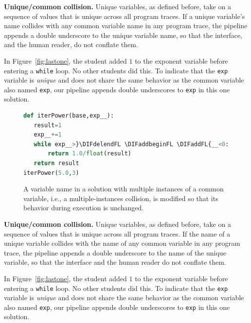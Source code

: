 \documentclass[12pt,twoside]{mitthesis}
\newcommand \codevar[1]{\texttt{#1}}
\providecommand{\DIFaddtex}[1]{{\protect\color{blue}\uwave{#1}}} %
\providecommand{\DIFaddFL}[1]{\DIFadd{#1}} %
\providecommand{\DIFaddbeginFL}{} %
\providecommand{\DIFdelendFL}{} %
\providecommand{\DIFadd}[1]{\texorpdfstring{\DIFaddtex{#1}}{#1}} %
\begin{document}
{\bf Unique/common collision.} Unique variables, as defined before, take on a sequence of values that is unique across all program traces. If a unique variable's name collides with any common variable name in any program trace, the pipeline appends a double underscore to the unique variable name, so that the interface, and the human reader, do not conflate them. 

In Figure~\ref{fig:lastone}, the student added $1$ to the exponent variable before entering a \codevar{while} loop. No other students did this. To indicate that the \codevar{exp} variable is {\it unique} and does not share the same behavior as the common variable also named \codevar{exp}, our pipeline appends double underscores to \codevar{exp} in this one solution. 

\begin{figure}
\begin{minipage}{0.45\linewidth}
\begin{lstlisting}[basicstyle=\linespread{1.0}\ttfamily\footnotesize,language=python,linebackgroundcolor={\lstcolorlines[gray!20]{1,3,4,6}}]
def iterPower(base,exp__):
   result=1
   exp__+=1
   while exp__>}\DIFdelendFL \DIFaddbeginFL \DIFaddFL{__<0:
       return 1.0/float(result)
   return result
iterPower(5.0,3)
\end{lstlisting}
\end{minipage}

\caption{A variable name in a solution with multiple instances of a common variable, i.e., a multiple-instances collision, is modified so that its behavior during execution is unchanged.}
\label{fig:multiinst}
\end{figure}

{\bf Unique/common collision.} Unique variables, as defined before, take on a sequence of values that is unique across all program traces. If the name of a unique variable collides with the name of any common variable in any program trace, the pipeline appends a double underscore to the name of the unique variable, so that the interface and the human reader do not conflate them. 

In Figure~\ref{fig:lastone}, the student added $1$ to the exponent variable before entering a \codevar{while} loop. No other students did this. To indicate that the \codevar{exp} variable is {\it unique} and does not share the same behavior as the common variable also named \codevar{exp}, our pipeline appends double underscores to \codevar{exp} in this one solution. 
\end{document}
